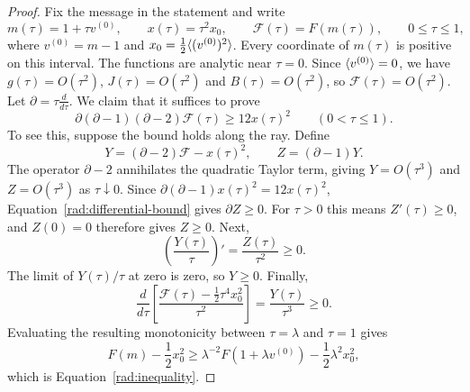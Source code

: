 \begin{proof}
Fix the message in the statement and
write
\[
 m(\tau)=1+\tau v^{(0)},\qquad x(\tau)=\tau^2x_0,
 \qquad \mathcal F(\tau)=F(m(\tau)),\qquad 0\leq\tau\leq1,
\]
where $v^{(0)}=m-1$ and $x_0=\frac12\langle (v^{(0)})^2\rangle$.
Every coordinate of $m(\tau)$ is positive on this interval.
The functions are analytic near $\tau=0$.  Since $\langle v^{(0)}\rangle=0$,
we have $g(\tau)=O(\tau^2)$, $J(\tau)=O(\tau^2)$ and
$B(\tau)=O(\tau^2)$, so $\mathcal F(\tau)=O(\tau^2)$.
Let $\partial=\tau\frac{d}{d\tau}$. We claim that it suffices to prove
\begin{equation}\label{rad:differential-bound}
 \partial(\partial-1)(\partial-2)\mathcal F(\tau)
 \geq12x(\tau)^2\qquad(0<\tau\leq1).
\end{equation}
To see this, suppose the bound holds along the ray.
Define
\[
 Y=(\partial-2)\mathcal F-x(\tau)^2,\qquad Z=(\partial-1)Y.
\]
The operator $\partial-2$ annihilates the quadratic Taylor term, giving
$Y=O(\tau^3)$ and $Z=O(\tau^3)$ as $\tau\downarrow0$.
Since $\partial(\partial-1)x(\tau)^2=12x(\tau)^2$,
Equation~\eqref{rad:differential-bound} gives $\partial Z\geq0$.
For $\tau>0$ this means $Z'(\tau)\geq0$, and $Z(0)=0$ therefore gives
$Z\geq0$.  Next,
\[
 \left(\frac{Y(\tau)}{\tau}\right)'
   =\frac{Z(\tau)}{\tau^2}\geq0.
\]
The limit of $Y(\tau)/\tau$ at zero is zero, so $Y\geq0$.  Finally,
\[
 \frac{d}{d\tau}
 \left[\frac{\mathcal F(\tau)-\tfrac12\tau^4x_0^2}{\tau^2}\right]
 =\frac{Y(\tau)}{\tau^3}\geq0.
\]
Evaluating the resulting monotonicity between $\tau=\lambda$ and $\tau=1$
gives
\[
 F(m)-\frac12x_0^2
 \geq\lambda^{-2}F(1+\lambda v^{(0)})
          -\frac12\lambda^2x_0^2,
\]
which is Equation~\eqref{rad:inequality}.


\end{proof}
